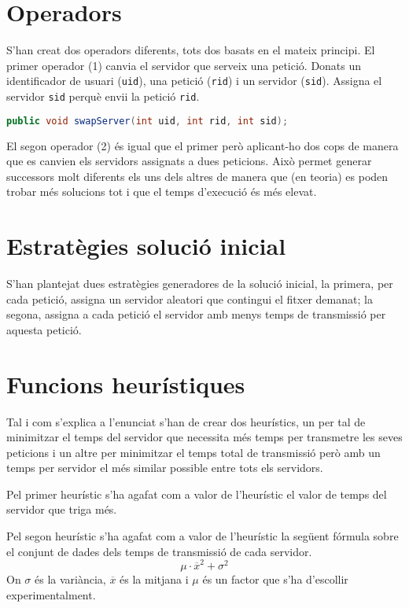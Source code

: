 \documentclass[a4paper, 12pt]{article}
\begin{document}
\section{Operadors}

S'han  creat dos operadors diferents, tots dos basats en el mateix principi. El primer operador (1)
canvia el servidor que serveix una petició. Donats un identificador
de usuari (\verb|uid|), una petició (\verb|rid|) i un servidor (\verb|sid|). Assigna el servidor \verb|sid|
perquè envii la petició \verb|rid|.

\begin{lstlisting}[language=java ]
public void swapServer(int uid, int rid, int sid);
\end{lstlisting}

El segon operador (2) és igual que el primer però aplicant-ho dos cops de manera que es canvien els servidors 
assignats a dues peticions. Això permet generar successors molt diferents els uns dels altres de manera que
(en teoria) es poden trobar més solucions tot i que el temps d'execució és més elevat.

\section{Estratègies solució inicial}
S'han plantejat dues estratègies generadores de la solució inicial, la primera, per cada petició, assigna
un servidor aleatori que contingui el fitxer demanat; la segona, assigna a cada petició el servidor amb menys
temps de transmissió per aquesta petició. 


\section{Funcions heurístiques}
Tal i com s'explica a l'enunciat s'han de crear dos heurístics, un per tal de minimitzar el temps del servidor
que necessita més temps per transmetre les seves peticions i un altre per minimitzar el temps total de transmissió 
però amb un temps per servidor el més similar possible entre tots els servidors.

Pel primer heurístic s'ha agafat com a valor de l'heurístic el valor de temps del servidor que triga més.

Pel segon heurístic s'ha agafat com a valor de l'heurístic la següent fórmula sobre el conjunt de dades dels temps
de transmissió de cada servidor.
$$\mu\cdot\overline{x}^2 + \sigma^2$$
On $\sigma$ és la variància, $\overline{x}$ és la mitjana i $\mu$ és un factor que s'ha d'escollir experimentalment.
\end{document}
